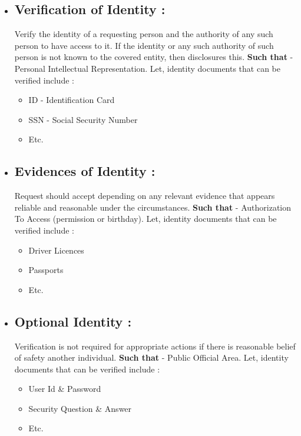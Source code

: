 \documentclass[a4paper,12pt]{article}
\begin{document}
        \begin{itemize}

            \item {\subsection*{Verification of Identity :}}
                Verify the identity of a requesting person and the authority of any such person to have access to it.
                If the identity or any such authority of such person is not known to the covered entity, then disclosures this.
                \textbf{Such that} - Personal Intellectual Representation.
                Let, identity documents that can be verified include :
                {\begin{itemize}
                    \item {ID - Identification Card}
                    \item {SSN - Social Security Number}
                    \item {Etc.}
                \end{itemize}}

            \item {\subsection*{Evidences of Identity :}}
                Request should accept depending on any relevant evidence that appears reliable and reasonable under the circumstances.
                \textbf{Such that} - Authorization To Access (permission or birthday).
                Let, identity documents that can be verified include :
                {\begin{itemize}
                    \item {Driver Licences}
                    \item {Passports}
                    \item {Etc.}
                \end{itemize}}

            \item {\subsection*{Optional Identity :}}
                Verification is not required for appropriate actions if there is reasonable belief of safety another individual.
                \textbf{Such that} - Public Official Area.
                Let, identity documents that can be verified include :
                {\begin{itemize}
                    \item {User Id \& Password}
                    \item {Security Question \& Answer}
                    \item {Etc.}
                \end{itemize}}

        \end{itemize}

    \newpage
	
\end{document}
